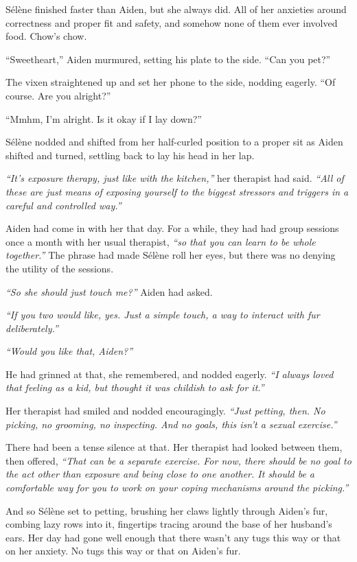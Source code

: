 Sélène finished faster than Aiden, but she always did. All of her anxieties around correctness and proper fit and safety, and somehow none of them ever involved food. Chow's chow.

``Sweetheart,'' Aiden murmured, setting his plate to the side. ``Can you pet?''

The vixen straightened up and set her phone to the side, nodding eagerly. ``Of course. Are you alright?''

``Mmhm, I'm alright. Is it okay if I lay down?''

Sélène nodded and shifted from her half-curled position to a proper sit as Aiden shifted and turned, settling back to lay his head in her lap.

\emph{``It's exposure therapy, just like with the kitchen,''} her therapist had said. \emph{``All of these are just means of exposing yourself to the biggest stressors and triggers in a careful and controlled way.''}

Aiden had come in with her that day. For a while, they had had group sessions once a month with her usual therapist, \emph{``so that you can learn to be whole together.''} The phrase had made Sélène roll her eyes, but there was no denying the utility of the sessions.

\emph{``So she should just touch me?''} Aiden had asked.

\emph{``If you two would like, yes. Just a simple touch, a way to interact with fur deliberately.''}

\emph{``Would you like that, Aiden?''}

He had grinned at that, she remembered, and nodded eagerly. \emph{``I always loved that feeling as a kid, but thought it was childish to ask for it.''}

Her therapist had smiled and nodded encouragingly. \emph{``Just petting, then. No picking, no grooming, no inspecting. And no goals, this isn't a sexual exercise.''}

There had been a tense silence at that. Her therapist had looked between them, then offered, \emph{``That can be a separate exercise. For now, there should be no goal to the act other than exposure and being close to one another. It should be a comfortable way for you to work on your coping mechanisms around the picking.''}

And so Sélène set to petting, brushing her claws lightly through Aiden's fur, combing lazy rows into it, fingertips tracing around the base of her husband's ears. Her day had gone well enough that there wasn't any tugs this way or that on her anxiety. No tugs this way or that on Aiden's fur.

